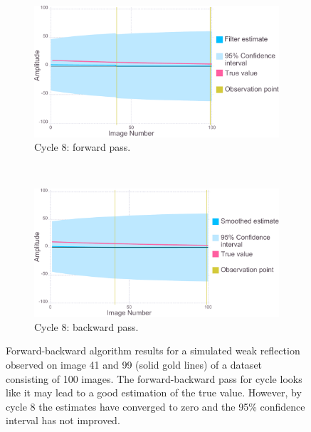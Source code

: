 \begin{figure}
    \ContinuedFloat
    \begin{subfigure}[b]{1.0\textwidth}
        \centering
        \includegraphics[width=\textwidth]{figures/datared/intDecSim_Filt8_bad.pdf}
        \caption{Cycle 8: forward pass.}
        \label{fig:UKF simulation results - cycle 8 - bad}
    \end{subfigure}
    \\
    \begin{subfigure}[b]{1.0\textwidth}
        \centering
        \includegraphics[width=\textwidth]{figures/datared/intDecSim8_bad.pdf}
        \caption{Cycle 8: backward pass.}
        \label{fig:URTSS simulation results - cycle 8 - bad}
    \end{subfigure}
    \caption[Forward-backward algorithm results for simulated data for a weak reflection.]{Forward-backward algorithm results for a simulated weak reflection observed on image 41 and 99 (solid gold lines) of a dataset consisting of 100 images.
    The forward-backward pass for cycle looks like it may lead to a good estimation of the true value.
    However, by cycle 8 the estimates have converged to zero and the 95\% confidence interval has not improved.}
    \label{fig:forward-backward algorithm simulation results - bad}
\end{figure}


